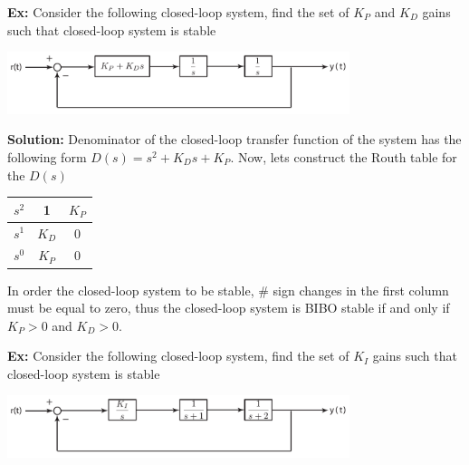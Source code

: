 \documentclass[twoside]{article}
\begin{document}
\vspace{12pt}

\textbf{Ex:} Consider the following closed-loop system, find 
the set of $K_P$ and $K_D$ gains such that closed-loop system is stable

  \begin{minipage}[h]{1\linewidth}
    \begin{center}
      \includegraphics[width=0.75\textwidth]{example2}
    \end{center}
  \end{minipage}

\textbf{Solution:} Denominator of the closed-loop transfer function 
of the system has the following form
$D(s) = s^2 + K_D s + K_P$. Now, lets construct the Routh table for the $D(s)$
%
\begin{table}[h]
\begin{center}
\begin{tabular}{|c || c || c  |}
\hline
$s^2$ & 1 & $K_P$ 
\\ \hline
$s^1$ & $K_D$ & 0 
\\ \hline
$s^0$ & $K_P$ & 0 
\\ \hline
\end{tabular}
\end{center}
\end{table}

In order the closed-loop system to be stable, $\#$ sign changes in the
first column must
be equal to zero, thus the closed-loop system is BIBO stable
if and only if $K_P > 0$ and $K_D > 0$.

\vspace{6pt} 

\textbf{Ex:} Consider the following closed-loop system, find 
the set of $K_I$ gains such that closed-loop system is stable

  \begin{minipage}[h]{1\linewidth}
    \begin{center}
      \includegraphics[width=0.75\textwidth]{example5}
    \end{center}
  \end{minipage}
\end{document}
